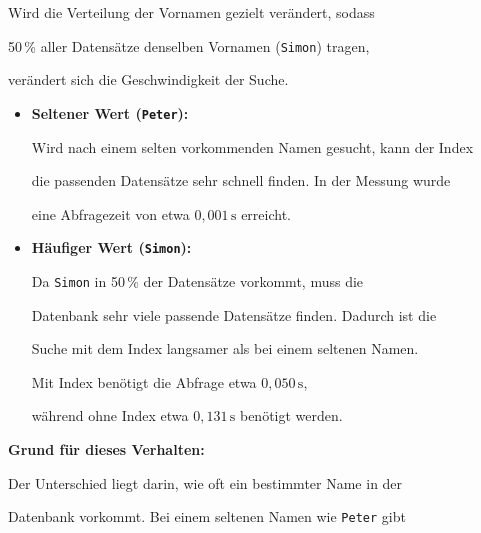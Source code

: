 \documentclass{article}
\begin{document}
Wird die Verteilung der Vornamen gezielt verändert, sodass

50\,\% aller Datensätze denselben Vornamen (\texttt{Simon}) tragen,

verändert sich die Geschwindigkeit der Suche.

%
%



\begin{itemize}

    \item \textbf{Seltener Wert (\texttt{Peter}):}

    Wird nach einem selten vorkommenden Namen gesucht, kann der Index

    die passenden Datensätze sehr schnell finden. In der Messung wurde

    eine Abfragezeit von etwa $0{,}001\,\mathrm{s}$ erreicht.


    \item \textbf{Häufiger Wert (\texttt{Simon}):}

    Da \texttt{Simon} in 50\,\% der Datensätze vorkommt, muss die

    Datenbank sehr viele passende Datensätze finden. Dadurch ist die

    Suche mit dem Index langsamer als bei einem seltenen Namen.

    Mit Index benötigt die Abfrage etwa $0{,}050\,\mathrm{s}$,

    während ohne Index etwa $0{,}131\,\mathrm{s}$ benötigt werden.

\end{itemize}



\textbf{Grund für dieses Verhalten:}

Der Unterschied liegt darin, wie oft ein bestimmter Name in der

Datenbank vorkommt. Bei einem seltenen Namen wie \texttt{Peter} gibt
\end{document}
